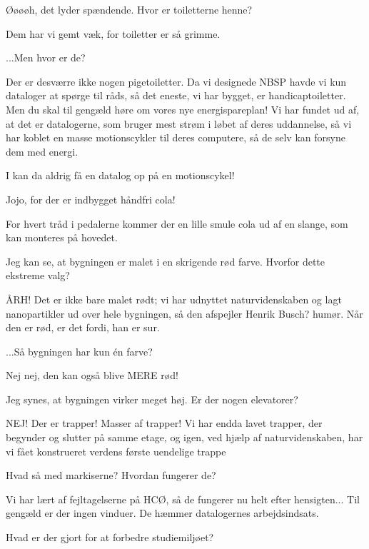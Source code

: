 \documentclass[a4paper,11pt]{article}
\begin{document}
\begin{sketch}
 Øøøøh, det lyder spændende. Hvor er toiletterne henne?

 Dem har vi gemt væk, for toiletter er så grimme.

 ...Men hvor er de?

 Der er desværre ikke nogen pigetoiletter. Da vi designede NBSP havde vi kun dataloger at spørge til råds, så det eneste, vi har bygget, er handicaptoiletter. Men du skal til gengæld høre om vores nye energispareplan! Vi har fundet ud af, at det er datalogerne, som bruger mest strøm i løbet af deres uddannelse, så vi har koblet en masse motionscykler til deres computere, så de selv kan forsyne dem med energi.

 I kan da aldrig få en datalog op på en motionscykel!

 Jojo, for der er indbygget håndfri cola!


 For hvert tråd i pedalerne kommer der en lille smule cola ud af en slange, som kan monteres på hovedet.

 Jeg kan se, at bygningen er malet i en skrigende rød farve. Hvorfor dette ekstreme valg?

 ÅRH! Det er ikke bare malet rødt; vi har udnyttet naturvidenskaben og lagt nanopartikler ud over hele bygningen, så den afspejler Henrik Busch? humør. Når den er rød, er det fordi, han er sur.

 ...Så bygningen har kun én farve?

 Nej nej, den kan også blive MERE rød!

 Jeg synes, at bygningen virker meget høj. Er der nogen elevatorer?

 NEJ! Der er trapper! Masser af trapper! Vi har endda lavet trapper, der begynder og slutter på samme etage, og igen, ved hjælp af naturvidenskaben, har vi fået konstrueret verdens første uendelige trappe \linebreak


 Hvad så med markiserne? Hvordan fungerer de?

 Vi har lært af fejltagelserne på HCØ, så de fungerer nu helt efter hensigten... Til gengæld er der ingen vinduer. De hæmmer datalogernes arbejdsindsats.

 Hvad er der gjort for at forbedre studiemiljøet?


\end{sketch}
\end{document}
